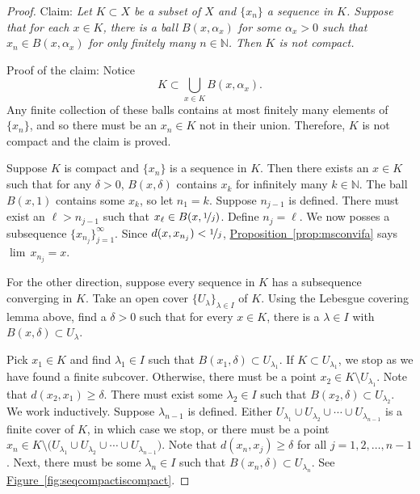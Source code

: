 \documentclass[12pt,openany]{book}
\newcommand{\N}{{\mathbb{N}}}
\theoremstyle{plain}
\theoremstyle{remark}
\theoremstyle{definition}
\theoremstyle{exercise}
\theoremstyle{example}
\newcommand{\figureref}[1]{\hyperref[#1]{Figure~\ref*{#1}}}
\newcommand{\propref}[1]{\hyperref[#1]{Proposition~\ref*{#1}}}
\begin{document}
\begin{proof}
Claim: \emph{Let $K \subset X$ be a subset of $X$ and
$\{ x_n \}$ a sequence in $K$.  Suppose that for each $x \in K$,
there is a ball $B(x,\alpha_x)$ for some $\alpha_x > 0$ such that
$x_n \in B(x,\alpha_x)$ for only finitely many $n \in \N$.
Then $K$ is not compact.}

Proof of the claim:
Notice
\begin{equation*}
K \subset \bigcup_{x \in K} B(x,\alpha_x) .
\end{equation*}
Any finite collection of these balls contains at most finitely many
elements of $\{ x_n \}$,
and so there must be an $x_n \in K$
not in their union.  Therefore, $K$ is not compact and the claim is
proved.

Suppose $K$ is compact and $\{ x_n \}$ is a sequence in $K$.
Then there exists an $x \in K$ such that
for any $\delta > 0$,
$B(x,\delta)$ contains $x_k$ for infinitely many $k \in \N$.
The ball $B(x,1)$ contains some $x_k$, so let $n_1 = k$.
Suppose $n_{j-1}$ is defined.
There must exist an $\ell > n_{j-1}$
such that $x_\ell \in B(x,\nicefrac{1}{j})$.  Define
$n_j = \ell$.
We now posses a subsequence $\{ x_{n_j} \}_{j=1}^\infty$.
Since
$d(x,x_{n_j}) < \nicefrac{1}{j}$,  \propref{prop:msconvifa} says
$\lim\, x_{n_j} = x$.

For the other direction, suppose every sequence in $K$
has a 
subsequence converging in $K$.
Take
an open cover $\{ U_\lambda \}_{\lambda \in I}$ of $K$.
Using the Lebesgue covering lemma above, find a $\delta > 0$
such that for every $x \in K$, there is a $\lambda \in I$ with
$B(x,\delta) \subset U_\lambda$.

Pick $x_1 \in K$ and find $\lambda_1 \in I$ such that $B(x_1,\delta) \subset
U_{\lambda_1}$.
If $K \subset U_{\lambda_1}$, we stop as we have found a
finite subcover.
Otherwise, there must be
a point $x_2 \in K \setminus U_{\lambda_1}$.
Note that $d(x_2,x_1) \geq \delta$.
There must exist some $\lambda_2 \in I$ such that
$B(x_2,\delta) \subset U_{\lambda_2}$.
We work inductively.  Suppose $\lambda_{n-1}$ is defined.
Either
$U_{\lambda_1} \cup
U_{\lambda_2} \cup \cdots \cup
U_{\lambda_{n-1}}$ is a finite cover of $K$, in which case we
stop, or
there must be 
a point $x_n \in K \setminus \bigl( U_{\lambda_1} \cup
U_{\lambda_2} \cup \cdots \cup
U_{\lambda_{n-1}}\bigr)$.
Note that $d(x_n,x_j) \geq \delta$ for all $j = 1,2,\ldots,n-1$.
Next, there must be some $\lambda_n \in I$
such that $B(x_n,\delta) \subset U_{\lambda_n}$.
See \figureref{fig:seqcompactiscompact}.


\end{proof}
\end{document}
